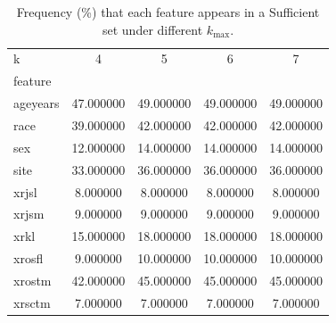 \begin{table}
\caption{Frequency (\%) that each feature appears in a Sufficient set under different $k_{\max}$.}
\label{tab:sane-robust}
\begin{tabular}{lcccc}
\toprule
k & 4 & 5 & 6 & 7 \\
feature &  &  &  &  \\
\midrule
ageyears & 47.000000 & 49.000000 & 49.000000 & 49.000000 \\
race & 39.000000 & 42.000000 & 42.000000 & 42.000000 \\
sex & 12.000000 & 14.000000 & 14.000000 & 14.000000 \\
site & 33.000000 & 36.000000 & 36.000000 & 36.000000 \\
xrjsl & 8.000000 & 8.000000 & 8.000000 & 8.000000 \\
xrjsm & 9.000000 & 9.000000 & 9.000000 & 9.000000 \\
xrkl & 15.000000 & 18.000000 & 18.000000 & 18.000000 \\
xrosfl & 9.000000 & 10.000000 & 10.000000 & 10.000000 \\
xrostm & 42.000000 & 45.000000 & 45.000000 & 45.000000 \\
xrsctm & 7.000000 & 7.000000 & 7.000000 & 7.000000 \\
\bottomrule
\end{tabular}
\end{table}
